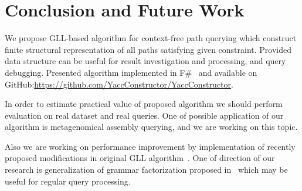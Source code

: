 \section{Conclusion and Future Work}

We propose GLL-based algorithm for context-free path querying which construct finite structural representation of all paths satisfying given constraint.
Provided data structure can be useful for result investigation and processing, and query debugging.
Presented algorithm implemented in F\#~\cite{FSharp} and available on GitHub:\url{https://github.com/YaccConstructor/YaccConstructor}.

In order to estimate practical value of proposed algorithm we should perform evaluation on real dataset and real queries.
One of possible application of our algorithm is metagenomical assembly querying, and we are working on this topic.

Also we are working on performance improvement by implementation of recently proposed modifications in original GLL algorithm~\cite{FGLL,FastPracticalGLL}.
One of direction of our research is generalization of grammar factorization proposed in~\cite{FGLL} which may be useful for regular query processing.

